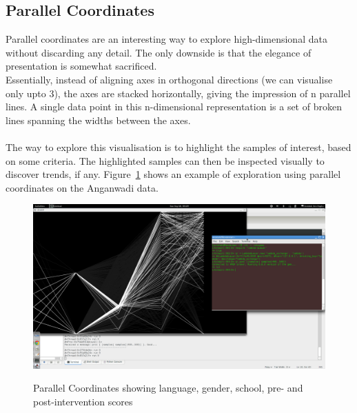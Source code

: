 \documentclass[10pt]{article}
\begin{document}
\subsection{Parallel Coordinates}
Parallel coordinates are an interesting way to explore high-dimensional data without discarding any detail. The only downside is that the elegance of presentation is somewhat sacrificed.\\
Essentially, instead of aligning axes in orthogonal directions (we can visualise only upto 3), the axes are stacked horizontally, giving the impression of n parallel lines. A single data point in this n-dimensional representation is a set of broken lines spanning the widths between the axes.\\\\
The way to explore this visualisation is to highlight the samples of interest, based on some criteria. The highlighted samples can then be inspected visually to discover trends, if any. Figure~\ref{ParallelCoordinates} shows an example of exploration using parallel coordinates on the Anganwadi data.
\begin{figure}
\caption{Parallel Coordinates showing language, gender, school, pre- and post-intervention scores}
\label{ParallelCoordinates}
\begin{center}
\includegraphics[width=150mm]{ReportMedia/ParallelCoordinates.jpg}\\
\end{center}
\end{figure}
\end{document}
